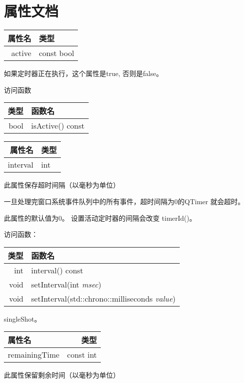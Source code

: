 \section{属性文档}

\begin{tabular}{|r|l|}
	\hline
	属性名&	类型 \\ 
	\hline
active&	const bool \\ 
	\hline 
\end{tabular}

如果定时器正在执行，这个属性是true, 否则是false。

访问函数

\begin{tabular}{|r|l|}
	\hline
类型 &	函数名 \\ 
\hline
bool	& isActive() const \\ 
	\hline 
\end{tabular}

\begin{tabular}{|r|l|}
	\hline
属性名	 & 类型 \\
\hline
interval & 	int \\
	\hline 
\end{tabular}

此属性保存超时间隔（以毫秒为单位）

一旦处理完窗口系统事件队列中的所有事件，超时间隔为0的QTimer 就会超时。

此属性的默认值为0。 设置活动定时器的间隔会改变 timerId()。

访问函数：

\begin{tabular}{|r|l|}
	\hline
类型	 & 函数名 \\
\hline
int & 	interval() const \\
\hline
void	 & setInterval(int \emph{msec}) \\
\hline
void &	setInterval(std::chrono::milliseconds \emph{value}) \\
	\hline 
\end{tabular}


\begin{notice}[另请参阅]
singleShot。
\end{notice}

\begin{tabular}{|l|r|}
\hline
属性名	 & 类型 \\ 
\hline
remainingTime	& const int \\ 
\hline
\end{tabular}

此属性保留剩余时间（以毫秒为单位）

